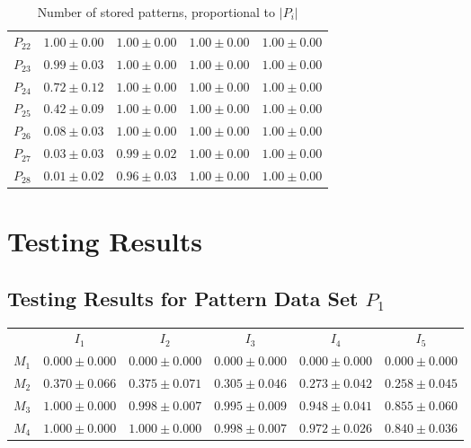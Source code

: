 \documentclass[12pt]{article}
\begin{document}
\begin{appendices}
\begin{table}[H]
\begin{tabular}{ccccc}
$P_{22}$  & $1.00\pm0.00$  & $1.00\pm0.00$  & $1.00\pm0.00$  & $1.00\pm0.00$ \\
$P_{23}$  & $0.99\pm0.03$  & $1.00\pm0.00$  & $1.00\pm0.00$  & $1.00\pm0.00$ \\
$P_{24}$  & $0.72\pm0.12$  & $1.00\pm0.00$  & $1.00\pm0.00$  & $1.00\pm0.00$ \\
$P_{25}$  & $0.42\pm0.09$  & $1.00\pm0.00$  & $1.00\pm0.00$  & $1.00\pm0.00$ \\
$P_{26}$  & $0.08\pm0.03$  & $1.00\pm0.00$  & $1.00\pm0.00$  & $1.00\pm0.00$ \\
$P_{27}$  & $0.03\pm0.03$  & $0.99\pm0.02$  & $1.00\pm0.00$  & $1.00\pm0.00$ \\
$P_{28}$  & $0.01\pm0.02$  & $0.96\pm0.03$  & $1.00\pm0.00$  & $1.00\pm0.00$ \\

    \end{tabular}
    \caption{Number of stored patterns, proportional to $\left|P_i\right|$}
    \end{table}
    
\section{Testing Results}
\subsection{Testing Results for Pattern Data Set $P_{1}$}


    \begin{table}[H]
    \centering
    \def\arraystretch{1.5}
    \footnotesize
    \begin{tabular}{cccccc}
    
 & $I_{1}$  & $I_{2}$  & $I_{3}$  & $I_{4}$  & $I_{5}$ \\ \cline{2-6}
$M_{1}$  & $0.000\pm0.000$  & $0.000\pm0.000$  & $0.000\pm0.000$  & $0.000\pm0.000$  & $0.000\pm0.000$ \\
$M_{2}$  & $0.370\pm0.066$  & $0.375\pm0.071$  & $0.305\pm0.046$  & $0.273\pm0.042$  & $0.258\pm0.045$ \\
$M_{3}$  & $1.000\pm0.000$  & $0.998\pm0.007$  & $0.995\pm0.009$  & $0.948\pm0.041$  & $0.855\pm0.060$ \\
$M_{4}$  & $1.000\pm0.000$  & $1.000\pm0.000$  & $0.998\pm0.007$  & $0.972\pm0.026$  & $0.840\pm0.036$ \\


\end{tabular}
\end{table}
\end{appendices}
\end{document}
